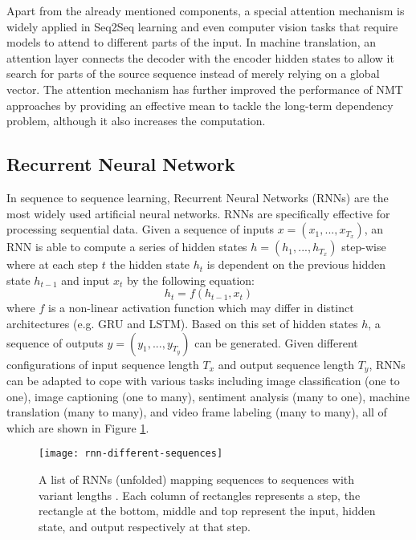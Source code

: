 Apart from the already mentioned components, a special attention mechanism is widely applied in Seq2Seq learning and even computer vision tasks that require models to attend to different parts of the input. In machine translation, an attention layer connects the decoder with the encoder hidden states to allow it search for parts of the source sequence instead of merely relying on a global vector. The attention mechanism has further improved the performance of NMT approaches by providing an effective mean to tackle the long-term dependency problem, although it also increases the computation.


\subsection{Recurrent Neural Network} \label{subsection:rnn}
In sequence to sequence learning, Recurrent Neural Networks (RNNs) are the most widely used artificial neural networks. RNNs are specifically effective for processing sequential data. Given a sequence of inputs $ x = (x_{1},...,x_{T_{x}}) $, an RNN is able to compute a series of hidden states $ h = (h_{1},...,h_{T_{x}}) $ step-wise where at each step $ t $ the hidden state $ h_{t} $ is dependent on the previous hidden state $ h_{t-1} $ and input $ x_{t} $ by the following equation:
\begin{equation} \label{equation:rnn hidden state}
h_{t} = f(h_{t-1}, x_{t})
\end{equation}
where $ f $ is a non-linear activation function which may differ in distinct architectures (e.g. GRU and LSTM). Based on this set of hidden states $ h $, a sequence of outputs $ y = (y_{1},...,y_{T_{y}}) $ can be generated. Given different configurations of input sequence length $ T_{x} $ and output sequence length $ T_{y} $, RNNs can be adapted to cope with various tasks including image classification (one to one), image captioning (one to many), sentiment analysis (many to one), machine translation (many to many), and video frame labeling (many to many), all of which are shown in Figure \ref{figure:rnn different sequences}.

\begin{figure}[h]
\texttt{[image: rnn-different-sequences]}
\centering
\caption{A list of RNNs (unfolded) mapping sequences to sequences with variant lengths \cite{karpathy2015unreasonable}. Each column of rectangles represents a step, the rectangle at the bottom, middle and top represent the input, hidden state, and output respectively at that step.}
\label{figure:rnn different sequences}
\end{figure}

